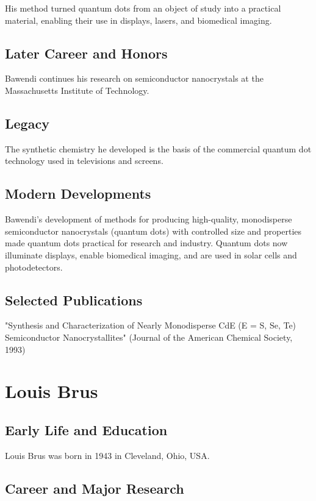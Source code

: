 His method turned quantum dots from an object of study into a practical material, enabling their use in displays, lasers, and biomedical imaging.

\subsection*{Later Career and Honors}

Bawendi continues his research on semiconductor nanocrystals at the Massachusetts Institute of Technology.

\subsection*{Legacy}

The synthetic chemistry he developed is the basis of the commercial quantum dot technology used in televisions and screens.

\subsection*{Modern Developments}

Bawendi's development of methods for producing high-quality, monodisperse semiconductor nanocrystals (quantum dots) with controlled size and properties made quantum dots practical for research and industry. Quantum dots now illuminate displays, enable biomedical imaging, and are used in solar cells and photodetectors.

\subsection*{Selected Publications}

"Synthesis and Characterization of Nearly Monodisperse CdE (E = S, Se, Te) Semiconductor Nanocrystallites" (Journal of the American Chemical Society, 1993)

\clearpage

\section{Louis Brus}

\subsection*{Early Life and Education}

Louis Brus was born in 1943 in Cleveland, Ohio, USA.

\subsection*{Career and Major Research}

